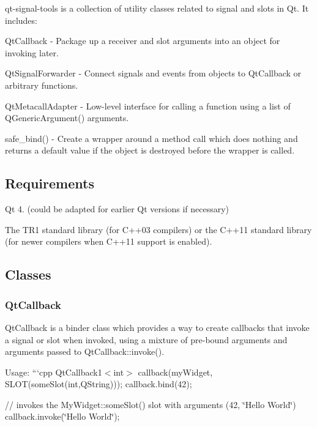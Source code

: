 qt-\/signal-\/tools is a collection of utility classes related to signal and slots in Qt. It includes\-:
\begin{DoxyItemize}
\item Qt\-Callback -\/ Package up a receiver and slot arguments into an object for invoking later.
\item Qt\-Signal\-Forwarder -\/ Connect signals and events from objects to Qt\-Callback or arbitrary functions.
\item Qt\-Metacall\-Adapter -\/ Low-\/level interface for calling a function using a list of Q\-Generic\-Argument() arguments.
\item safe\-\_\-bind() -\/ Create a wrapper around a method call which does nothing and returns a default value if the object is destroyed before the wrapper is called.
\end{DoxyItemize}

\subsection*{Requirements}


\begin{DoxyItemize}
\item Qt 4. (could be adapted for earlier Qt versions if necessary)
\item The T\-R1 standard library (for C++03 compilers) or the C++11 standard library (for newer compilers when C++11 support is enabled).
\end{DoxyItemize}

\subsection*{Classes}

\subsubsection*{Qt\-Callback}

Qt\-Callback is a binder class which provides a way to create callbacks that invoke a signal or slot when invoked, using a mixture of pre-\/bound arguments and arguments passed to Qt\-Callback\-::invoke().

Usage\-: ```cpp Qt\-Callback1$<$int$>$ callback(my\-Widget, S\-L\-O\-T(some\-Slot(int,\-Q\-String))); callback.\-bind(42);

// invokes the My\-Widget\-::some\-Slot() slot with arguments (42, \char`\"{}\-Hello World\char`\"{}) callback.\-invoke(\char`\"{}\-Hello World\char`\"{});

